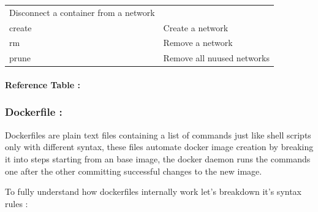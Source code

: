 \documentclass[
  14pt,
  english,
  a4paper,
]{scrreprt}
\begin{document}
\begin{longtable}[]{@{}ll@{}}
\begin{minipage}[t]{0.52\columnwidth}
Disconnect a container from a network\strut
\end{minipage}\tabularnewline
\begin{minipage}[t]{0.17\columnwidth}\raggedright
create\strut
\end{minipage} & \begin{minipage}[t]{0.52\columnwidth}\raggedright
Create a network\strut
\end{minipage}\tabularnewline
\begin{minipage}[t]{0.17\columnwidth}\raggedright
rm\strut
\end{minipage} & \begin{minipage}[t]{0.52\columnwidth}\raggedright
Remove a network\strut
\end{minipage}\tabularnewline
\begin{minipage}[t]{0.17\columnwidth}\raggedright
prune\strut
\end{minipage} & \begin{minipage}[t]{0.52\columnwidth}\raggedright
Remove all nuused networks\strut
\end{minipage}\tabularnewline
\bottomrule
\end{longtable}

\hypertarget{reference-table}{%
\paragraph*{Reference Table :}\label{reference-table}}

\hypertarget{dockerfile}{%
\subsubsection{Dockerfile :}\label{dockerfile}}

Dockerfiles are plain text files containing a list of commands just like
shell scripts only with different syntax, these files automate docker
image creation by breaking it into steps starting from an base image,
the docker daemon runs the commands one after the other committing
successful changes to the new image.

To fully understand how dockerfiles internally work let's breakdown it's
syntax rules :
\end{document}
